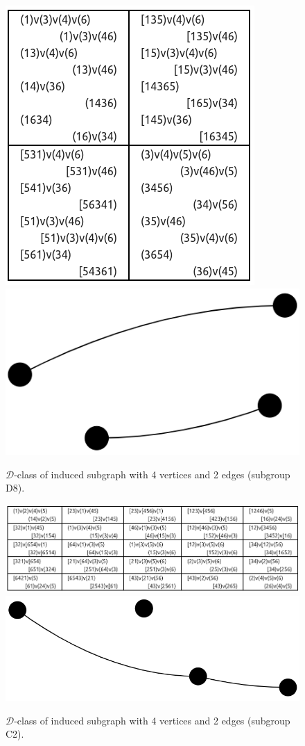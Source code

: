 \begin{appendices}
\begin{figure}[H]
\includegraphics[scale=0.25]{images/x1/x1_4v_2e_2.png}
\includegraphics[scale=0.2]{images/x1/x1_4v_2e_2_vis.png}
\caption{$\mathcal{D}$-class of induced subgraph with 4 vertices and 2 edges (subgroup D8).}
\end{figure}

\begin{figure}[H]
\includegraphics[scale=0.25]{images/x1/x1_4v_2e.png}
\includegraphics[scale=0.12]{images/x1/x1_4v_2e_1_vis.png}
\caption{$\mathcal{D}$-class of induced subgraph with 4 vertices and 2 edges (subgroup C2).}
\end{figure}


\end{appendices}
